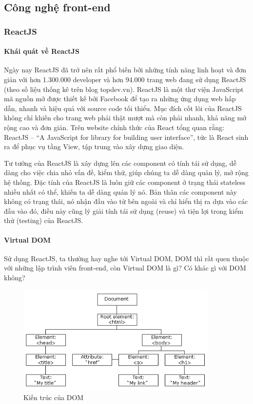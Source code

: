 \subsection{Công nghệ front-end}
\subsubsection{ReactJS}
\paragraph{Khái quát về ReactJS}

Ngày nay ReactJS đã trở nên rất phổ biến bởi những tính năng
linh hoạt và đơn giản với hơn 1.300.000 developer và hơn 94.000
trang web đang sử dụng ReactJS
(theo số liệu thống kê trên blog topdev.vn). 
ReactJS là một thư viện JavaScript mã nguồn mở được thiết kế
bởi Facebook để tạo ra những ứng dụng web hấp dẫn, nhanh và
hiệu quả với source code tối thiểu. Mục đích cốt lõi của
ReactJS không chỉ khiến cho trang web phải thật mượt mà còn
phải nhanh, khả năng mở rộng cao và đơn giản. Trên website chính
thức của React tổng quan rằng: ReactJS –
“A JavaScript for library for building user interface”,
tức là React sinh ra để phục vụ tầng View,
tập trung vào xây dựng giao diện. 

Tư tưởng của ReactJS là xây dựng lên các component có
tính tái sử dụng, dễ dàng cho việc chia nhỏ vấn đề, kiểm thử,
giúp chúng ta dễ dàng quản lý, mở rộng hệ thống. Đặc tính của
ReactJS là luôn giữ các component ở trạng thái stateless nhiều
nhất có thể, khiến ta dễ dàng quản lý nó. Bản thân các component
này không có trạng thái, nó nhận đầu vào từ bên ngoài và
chỉ hiển thị ra dựa vào các đầu vào đó, điều này
cũng lý giải tính tái sử dụng (reuse) và tiện lợi
trong kiểm thử (testing) của ReactJS.

\paragraph{Virtual DOM}
Sử dụng ReactJS, ta thường hay nghe tới Virtual DOM,
DOM thì rất quen thuộc với những lập trình viên front-end,
còn Virtual DOM là gì? Có khác gì với DOM không? 

\begin{figure}[H]
\centering
\includegraphics[width=10cm]{images/DOM.png}
\caption{Kiến trúc của DOM}
\label{fig:dom}
\end{figure}

